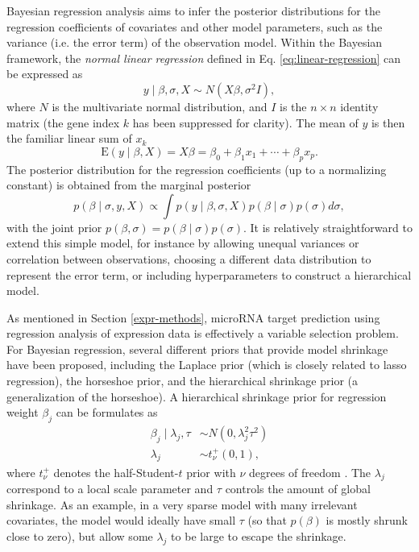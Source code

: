 Bayesian regression analysis aims to infer the posterior distributions
for the regression coefficients of covariates and other model parameters,
such as the variance (i.e. the error term) of the observation model.
Within the Bayesian framework, the \emph{normal linear regression} defined in
Eq. \eqref{eq:linear-regression} can be expressed as
\begin{equation}
  y \mid \beta, \sigma, X \sim N(X \beta, \sigma^2I),
  \label{eq:bayesian-linear-regression}
\end{equation}
where $N$ is the multivariate normal distribution, and $I$ is the $n \times n$
identity matrix (the gene index $k$ has been suppressed for clarity).
The mean of $y$ is then the familiar linear sum of $x_k$
\begin{equation}
  \textrm{E}(y\mid\beta,X) = X \beta = \beta_0 + \beta_1 x_1 + \dotsb + \beta_p x_p.
\end{equation}
The posterior distribution for the regression coefficients (up to a
normalizing constant) is obtained from the marginal posterior
\begin{equation}
  p(\beta \mid \sigma, y, X) \propto \int p(y \mid \beta, \sigma, X) p(\beta \mid \sigma) p(\sigma) d\sigma,
\end{equation}
with the joint prior $p(\beta, \sigma) = p(\beta \mid \sigma) p(\sigma)$.
It is relatively straightforward to extend this simple model, for instance by
allowing unequal variances or correlation between observations, choosing a
different data distribution
to represent the error term, or including hyperparameters to construct a
hierarchical model.

As mentioned in Section \ref{expr-methods}, microRNA target prediction using
regression analysis of expression data is effectively a variable selection
problem. For Bayesian regression, several different priors that provide model shrinkage
have been proposed, including the Laplace prior (which is closely related to
lasso regression), the horseshoe prior, and the hierarchical shrinkage prior
(a generalization of the horseshoe).
A hierarchical shrinkage prior for regression weight
$\beta_j$ can be formulates as
\begin{equation}
  \label{eq:hs-prior}
  \begin{aligned}
    \beta_j \mid \lambda_j, \tau & \sim N(0, \lambda_j^2 \tau^2) \\
    \lambda_j                 & \sim t_\nu^+(0,1),
  \end{aligned}
\end{equation}
where $t_\nu^+$ denotes the half-Student-$t$ prior with $\nu$ degrees of
freedom \citep{Piironen2015}. The $\lambda_j$ correspond to a local scale
parameter and $\tau$ controls the amount of global shrinkage. As an example,
in a very sparse model with many irrelevant covariates, the model would
ideally have small $\tau$ (so that $p(\beta)$ is mostly shrunk close to zero), but
allow some $\lambda_j$ to be large to escape the shrinkage.

